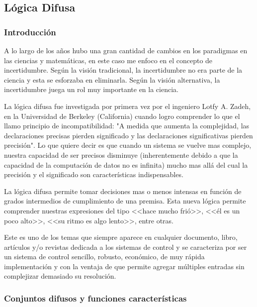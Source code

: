 
\subsection{Lógica Difusa}

\subsubsection{Introducción}

A lo largo de los años hubo una gran cantidad de cambios en los paradigmas en las ciencias y matemáticas, en este caso me enfoco en el concepto de incertidumbre. Según la visión tradicional, la incertidumbre no era parte de la ciencia y esta se esforzaba en eliminarla. Según la visión alternativa, la incertidumbre juega un rol muy importante en la ciencia. \par
La lógica difusa fue investigada por primera vez por el ingeniero Lotfy A. Zadeh, en la Universidad de Berkeley (California) cuando logro comprender lo que el llamo principio de incompatibilidad: "A medida que aumenta la complejidad, las declaraciones precisas pierden significado y las declaraciones significativas pierden precisión". Lo que quiere decir es que cuando un sistema se vuelve mas complejo, nuestra capacidad de ser precisos disminuye (inherentemente debido a que la capacidad de la computación de datos no es infinita) mucho mas allá del cual la precisión y el significado son características indispensables.\par
La lógica difusa permite tomar decisiones mas o menos intensas en función de grados intermedios de cumplimiento de una premisa. Esta nueva lógica permite comprender nuestras expresiones del tipo <<hace mucho frió>>, <<él es un poco alto>>, <<su ritmo es algo lento>>, entre otras.\par
Este es uno de los temas que siempre aparece en cualquier documento, libro, artículos y/o revistas dedicada a los sistemas de control y se caracteriza por ser un sistema de control sencillo, robusto, económico, de muy rápida implementación y con la ventaja de que permite agregar múltiples entradas sin complejizar demasiado su resolución.\par

\subsubsection{Conjuntos difusos y funciones características}

